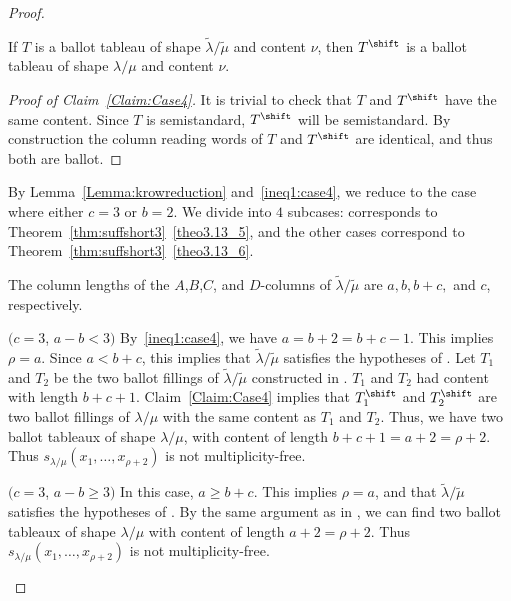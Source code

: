 \begin{proof}
\begin{Case}
\begin{claim}\label{Claim:Case4} If $T$ is a ballot tableau of shape $\tilde\lambda/\tilde\mu$ and content $\nu$, then $T^{\shift }$ is a ballot
tableau of shape $\lambda / \mu$ and content $\nu$.
\end{claim}

\begin{proof}[Proof of Claim~\ref{Claim:Case4}]
It is trivial to check that $T$ and $T^{\shift }$ have the same content. Since $T$ is semistandard, $T^{\shift }$ will be semistandard. By construction the column reading words of $T$ and $T^{\shift }$ are identical, and thus both are ballot. 
\end{proof}

By Lemma~\ref{Lemma:krowreduction} and~\eqref{ineq1:case4}, we reduce to the case where either $c=3$ or $b=2$. We divide into $4$ subcases:  corresponds to Theorem~\ref{thm:suffshort3}~\ref{theo3.13_5}, and the other cases correspond to Theorem~\ref{thm:suffshort3}~\ref{theo3.13_6}.


The column lengths of the $A$,$B$,$C$, and $D$-columns of $\tilde\lambda/\tilde\mu$ are $a, b, b+c,$ and $c$, respectively.

\end{Case}

\begin{Case}
{ $(c=3$, $a-b<3)$} 
By~\eqref{ineq1:case4}, we have $a = b+2 = b+c-1$. This implies $\rho = a$. Since $a<b+c$, this implies that $\tilde\lambda/\tilde\mu$ satisfies the hypotheses of . Let $T_1$ and $T_2$ be the two ballot fillings of $\tilde\lambda/\tilde\mu$ constructed in . $T_1$ and $T_2$ had content with length $b+c+1$. Claim~\ref{Claim:Case4} implies that $T_1^{\shift }$ and $T_2^{\shift }$ are two ballot fillings of $\lambda / \mu$ with the same content as $T_1$ and $T_2$. Thus, we have two ballot tableaux of shape $\lambda / \mu$, with content of length $b+c+1 = a+2 = \rho + 2$. Thus $s_{\lambda/\mu}(x_1,\ldots,x_{\rho+2})$ is not multiplicity-free.
\end{Case}

\begin{Case}
{ $(c=3$, $a-b\geq 3)$} 
In this case, $a\geq b+c$. This implies $\rho = a$, and that $\tilde\lambda/\tilde\mu$ satisfies the hypotheses of . By the same argument as in , we can find two ballot tableaux of shape $\lambda / \mu$ with content of length $a + 2 = \rho + 2$. Thus $s_{\lambda/\mu}(x_1,\ldots,x_{\rho+2})$ is not multiplicity-free.
\end{Case}


\end{proof}
